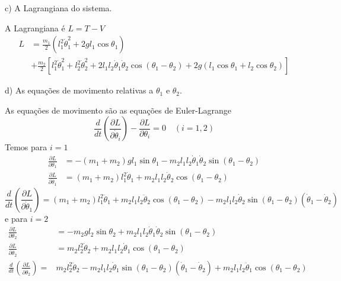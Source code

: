 \begin{enumerate}[start=1,label={\bfseries Q\arabic*.}]
c) A Lagrangiana do sistema.

\resposta A Lagrangiana é $L=T-V$
$$
\begin{aligned}
L &=\frac{m_{1}}{2}\left(l_{1}^{2} \dot{\theta}_{1}^{2}+2 g l_{1} \cos \theta_{1}\right) \\
&+\frac{m_{2}}{2}\left[l_{1}^{2} \dot{\theta}_{1}^{2}+l_{2}^{2} \dot{\theta}_{2}^{2}+2 l_{1} l_{2} \dot{\theta}_{1} \dot{\theta}_{2} \cos \left(\theta_{1}-\theta_{2}\right)+2 g\left(l_{1} \cos \theta_{1}+l_{2} \cos \theta_{2}\right)\right]
\end{aligned}
$$


d) As equações de movimento relativas a $\theta_{1}$ e $\theta_{2}$.

\resposta As equações de movimento são as equações de Euler-Lagrange
$$
\frac{d}{d t}\left(\frac{\partial L}{\partial \dot{\theta}_{i}}\right)-\frac{\partial L}{\partial \theta_{i}}=0 \quad(i=1,2)
$$
Temos para $i=1$
$$
\begin{aligned}
\frac{\partial L}{\partial \theta_{1}} &=-\left(m_{1}+m_{2}\right) g l_{1} \sin \theta_{1}-m_{2} l_{1} l_{2} \dot{\theta}_{1} \dot{\theta}_{2} \sin \left(\theta_{1}-\theta_{2}\right) \\
\frac{\partial L}{\partial \dot{\theta}_{1}} &=\left(m_{1}+m_{2}\right) l_{1}^{2} \dot{\theta}_{1}+m_{2} l_{1} l_{2} \dot{\theta}_{2} \cos \left(\theta_{1}-\theta_{2}\right)
\end{aligned}
$$
%
$$
\frac{d}{d t}\left(\frac{\partial L}{\partial \dot{\theta}_{1}}\right)=\left(m_{1}+m_{2}\right) l_{1}^{2} \ddot{\theta}_{1}+m_{2} l_{1} l_{2} \ddot{\theta}_{2} \cos \left(\theta_{1}-\theta_{2}\right)-m_{2} l_{1} l_{2} \dot{\theta}_{2} \sin \left(\theta_{1}-\theta_{2}\right)\left(\dot{\theta}_{1}-\dot{\theta}_{2}\right)
$$
e para $i=2$
$$
\begin{aligned}
\frac{\partial L}{\partial \theta_{2}} &=-m_{2} g l_{2} \sin \theta_{2}+m_{2} l_{1} l_{2} \dot{\theta}_{1} \dot{\theta}_{2} \sin \left(\theta_{1}-\theta_{2}\right) \\
\frac{\partial L}{\partial \dot{\theta}_{2}} &=m_{2} l_{2}^{2} \dot{\theta}_{2}+m_{2} l_{1} l_{2} \dot{\theta}_{1} \cos \left(\theta_{1}-\theta_{2}\right) \\
\frac{d}{d t}\left(\frac{\partial L}{\partial \dot{\theta}_{2}}\right)=& m_{2} l_{2}^{2} \ddot{\theta}_{2}-m_{2} l_{1} l_{2} \dot{\theta}_{1} \sin \left(\theta_{1}-\theta_{2}\right)\left(\dot{\theta}_{1}-\dot{\theta}_{2}\right)+m_{2} l_{1} l_{2} \ddot{\theta}_{1} \cos \left(\theta_{1}-\theta_{2}\right)
\end{aligned}
$$
\end{enumerate}
